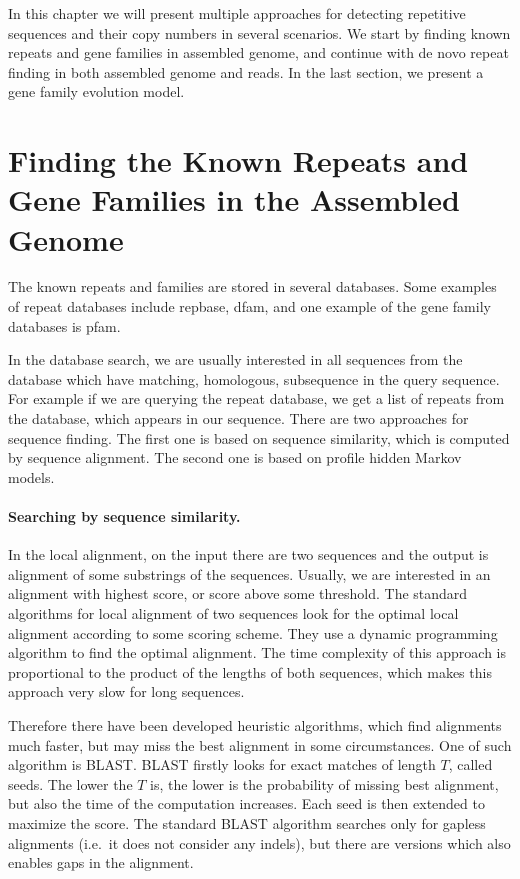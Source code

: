 In this chapter we will present multiple approaches for detecting repetitive sequences and their copy numbers in several scenarios. We start by finding known repeats and gene families in assembled genome, and continue with de novo repeat finding in both assembled genome and reads. In the last section, we present a gene family evolution model.

\section{Finding the Known Repeats and Gene Families in the Assembled Genome}

The known repeats and families are stored in several databases. Some examples of repeat databases include repbase\cite{repbase}, dfam\cite{dfam}, and one example of the gene family databases is pfam\cite{pfam}.

In the database search, we are usually interested in all  sequences from the database which have matching, homologous, subsequence in the query sequence. For example if we are querying the repeat database, we get a list of repeats from the database, which appears in our sequence.
There are two approaches for sequence finding. The first one is based on sequence similarity, which is computed by sequence alignment. The second one is based on profile hidden Markov models.

\paragraph{Searching by sequence similarity.}
In the local alignment, on the input there are two sequences and the output is alignment of some substrings of the sequences. Usually, we are interested in an alignment with highest score, or score above some threshold.
The standard algorithms for local alignment of two sequences look for the optimal local alignment according to some scoring scheme. They use a dynamic programming algorithm to find the optimal alignment. The time complexity of this approach is proportional to the product of the lengths of both sequences, which makes this approach very slow for long sequences.

Therefore there have been developed heuristic algorithms, which find alignments much faster, but may miss the best alignment in some circumstances. One of such algorithm is BLAST\cite{blast}.
BLAST firstly looks for exact matches of length $T$, called seeds. The lower the $T$ is, the lower is the probability of missing best alignment, but also the time of the computation increases.
Each seed is then extended to maximize the score. The standard BLAST algorithm searches only for gapless alignments (i.e.\ it does not consider any indels), but there are versions which also enables gaps in the alignment.

